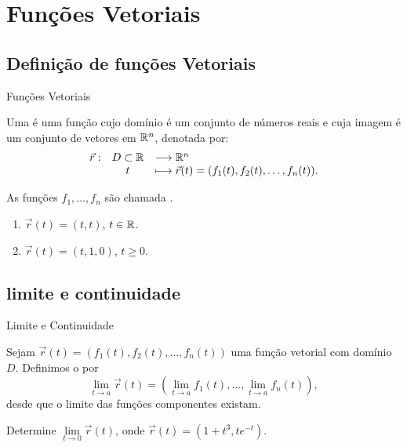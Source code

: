 \section{Funções Vetoriais}

\subsection*{Definição de funções Vetoriais}
\begin{frame}[label=fun-vet]{Funções Vetoriais}
\begin{defin}
Uma  é uma função cujo domínio é um conjunto de números reais e cuja imagem é um conjunto de vetores em $\mathbb{R}^n$, denotada por:
\[\begin{array}{lcl}
\vec{r}: & D\subset \mathbb{R} &  \longrightarrow \mathbb{R}^n\\
         & t           & \longmapsto \vec{r}(t)=(f_1(t),f_2(t),\ldots,f_n(t)).
\end{array}\]

As funções $f_1,\ldots,f_n$ são chamada .
\end{defin}

\begin{example}
\begin{enumerate}
\item $\vec{r}(t)=(t,t)$, $t\in \mathbb{R}$.
\item $\vec{r}(t)=(t,1,0)$, $t\geq 0$.
\end{enumerate}
\end{example}

\end{frame}


\subsection*{limite e continuidade}
\begin{frame}[label=fun-vet]{Limite e Continuidade}
\begin{defin}
Sejam $\vec{r}(t)=(f_1(t),f_2(t),\ldots,f_n(t))$ uma função vetorial com domínio $D$. Definimos o  por 
\[\lim\limits_{t\to a}\vec{r}(t)=\left(\lim\limits_{t\to a}f_1(t),\ldots,\lim\limits_{t\to a}f_n(t)\right), \]
desde que o limite das funções componentes existam.
\end{defin}

\begin{exer}
Determine $\lim\limits_{t\to 0}\vec{r}(t)$, onde $\vec{r}(t)=(1+t^3, te^{-t})$.
\end{exer}


\end{frame}

